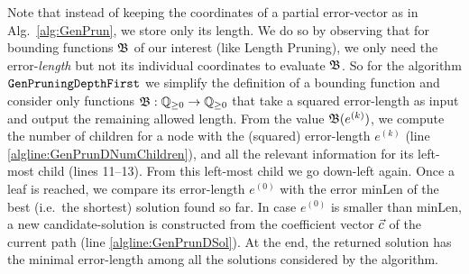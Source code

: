Note that instead of keeping the coordinates of a partial error-vector as in Alg.~\ref{alg:GenPrun}, we store only its length. We do so by observing that for bounding functions $\mathfrak{B}$ of our interest (like Length Pruning), we only need the error-\emph{length} but not its individual coordinates to evaluate $\mathfrak{B}$. So for the algorithm $\texttt{GenPruningDepthFirst}$ we simplify the definition of a bounding function and consider only functions $\mathfrak{B}: \mathbb{Q}_{\geq 0} \rightarrow \mathbb{Q}_{\geq 0}$ that take a squared error-length as input and output the remaining allowed length. From the value $\mathfrak{B}(e^{(k)})$, we compute the number of children for a node with the (squared) error-length $e^{(k)}$ (line \ref{algline:GenPrunDNumChildren}), and all the relevant information for its left-most child (lines 11--13). From this left-most child we go down-left again. Once a leaf is reached, we compare its error-length $e^{(0)}$ with the error $\text{minLen}$ of the best (i.e.\ the shortest) solution found so far. In case $e^{(0)}$ is smaller than $\text{minLen}$, a new candidate-solution is constructed from the coefficient vector $\cvec$ of the current path (line \ref{algline:GenPrunDSol}). At the end, the returned solution has the minimal error-length among all the solutions considered by the algorithm. 

%
%

